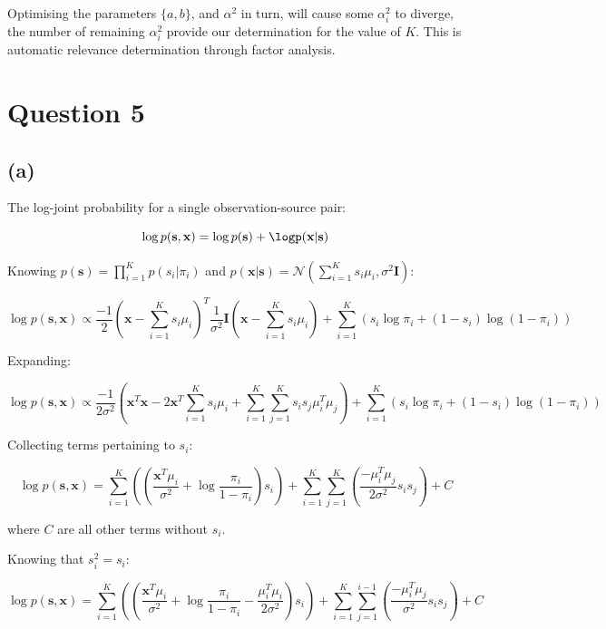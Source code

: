 \documentclass[12pt]{article}
\begin{document}
Optimising the parameters $\{a, b\}$, and $\alpha^2$ in turn, will cause some $\alpha_i^2$ to diverge, the number of remaining $\alpha_i^2$ provide our determination for the value of $K$. This is automatic relevance determination through factor analysis.

\newpage
\section*{Question 5}

\subsection*{(a)}

The log-joint probability for a single observation-source pair:

\[\log p(\textbf{s}, \textbf{x}) = \log p(\textbf{s}) + \logp(\textbf{x}|\textbf{s})\]

Knowing $p(\textbf{s}) = \prod_{i=1}^{K}p(s_i| \pi_i)$ and $p(\textbf{x}|\textbf{s}) = \mathcal{N}(\sum_{i=1}^{K} s_i \mu_i, \sigma^2 \textbf{I})$:

\[\log p(\textbf{s}, \textbf{x})  \propto \frac{-1}{2}\left( \textbf{x} - \sum_{i=1}^{K}s_i \mu_i\right)^T \frac{1}{\sigma^2} \textbf{I} \left( \textbf{x} - \sum_{i=1}^{K} s_i \mu_i\right) + \sum_{i=1}^{K} \left(s_i \log\pi_i + (1-s_i)\log(1-\pi_i)\right)\]

Expanding:

\[\log p(\textbf{s}, \textbf{x})  \propto \frac{-1}{2\sigma^2} \left( \textbf{x}^T\textbf{x} - 2\textbf{x}^T\sum_{i=1}^{K}s_i \mu_i + \sum_{i=1}^{K}\sum_{j=1}^{K}s_i s_j \mu_i^T \mu_j\right) + \sum_{i=1}^{K} \left(s_i \log\pi_i + (1-s_i)\log(1-\pi_i)\right)\]

Collecting terms pertaining to $s_i$:

\[\log p(\textbf{s}, \textbf{x})  =    \sum_{i=1}^{K} \left(\left(\frac{\textbf{x}^T \mu_i}{\sigma^2} +\log\frac{\pi_i}{1-\pi_i} \right) s_i\right) + \sum_{i=1}^{K}\sum_{j=1}^{K}\left( \frac{ - \mu_i^T \mu_j}{2\sigma^2} s_i s_j \right) + C\]

where $C$ are all other terms without $s_i$.

Knowing that $s_i^2= s_i$:

\[\log p(\textbf{s}, \textbf{x})  =    \sum_{i=1}^{K} \left(\left(\frac{\textbf{x}^T \mu_i}{\sigma^2} +\log\frac{\pi_i}{1-\pi_i} - \frac{\mu_i^T \mu_i}{2\sigma^2} \right) s_i\right) + \sum_{i=1}^{K}\sum_{j=1}^{i-1}\left( \frac{ - \mu_i^T \mu_j}{\sigma^2} s_i s_j \right) + C\]
\end{document}
